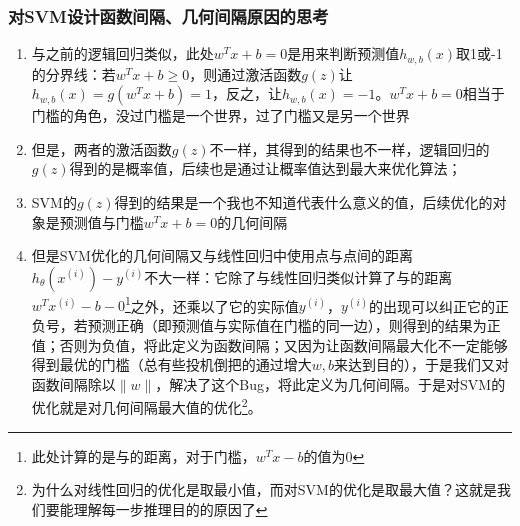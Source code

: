 \subsubsection{对SVM设计函数间隔、几何间隔原因的思考}
{\color{red}{注意，此部分内容仅仅是我自己的理解，不见得正确，请批判性地看。}}
\begin{enumerate}
	\item 与之前的逻辑回归类似，此处$w^Tx+b=0$是用来判断预测值$h_{w,b}(x)$取1或-1的分界线：若$w^Tx+b\geq0$，则通过激活函数$g(z)$让$h_{w,b}(x)=g(w^Tx+b)=1$，反之，让$h_{w,b}(x)=-1$。$w^Tx+b=0$相当于门槛的角色，没过门槛是一个世界，过了门槛又是另一个世界
	\item 但是，两者的激活函数$g(z)$不一样，其得到的结果也不一样，逻辑回归的$g(z)$得到的是概率值，后续也是通过让概率值达到最大来优化算法；
	\item SVM的$g(z)$得到的结果是一个我也不知道代表什么意义的值，后续优化的对象是预测值与门槛$w^Tx+b=0$的几何间隔
	\item 但是SVM优化的几何间隔又与线性回归中使用点与点间的距离$h_\theta(x^{(i)})-y^{(i)}$不大一样：它除了与线性回归类似计算了与{\color{red}{门槛}}的距离$w^Tx^{(i)}-b-0$\footnote{此处计算的是与{\color{red}{门槛}}的距离，对于门槛，$w^Tx-b$的值为0}之外，还乘以了它的实际值$y^{(i)}$，$y^{(i)}$的出现可以纠正它的正负号，若预测正确（即预测值与实际值在门槛的同一边），则得到的结果为正值；否则为负值，将此定义为函数间隔；又因为让函数间隔最大化不一定能够得到最优的门槛（总有些投机倒把的通过增大$w,b$来达到目的），于是我们又对函数间隔除以$\|w\|$，解决了这个Bug，将此定义为几何间隔。于是对SVM的优化就是对几何间隔最大值的优化\footnote{为什么对线性回归的优化是取最小值，而对SVM的优化是取最大值？这就是我们要能理解每一步推理目的的原因了}。
\end{enumerate}




















